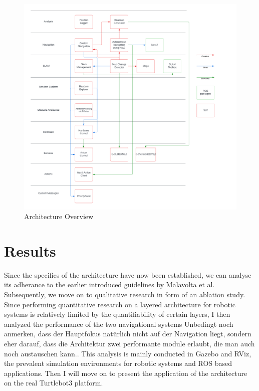 \documentclass[%
paper=A4,               %
twoside=true,           %
openright,              %
11pt,                   %
bibliography=totoc,     %
titlepage=on,           %
DIV=12,                 %
BCOR=1.5cm,             %
parskip=half,            %
final
]{scrreprt}
\begin{document}
			
	\begin{figure}[H]
		\begin{flushleft}
		\includegraphics[width=1.\textwidth]{Graphics/ArchitectureOverview}
		\caption{Architecture Overview}
		\label{fig: fig8}
		\end{flushleft}
	\end{figure}
	
	
	
	

	\chapter{Results}
	Since the specifics of the architecture have now been established, we can analyse its adherance to the earlier introduced guidelines by Malavolta et al. Subsequently, we move on to qualitative research in form of an ablation study.
	Since performing quantitative research on a layered architecture for robotic systems is relatively limited by the quantifiability of certain layers, I then analyzed the performance of the two navigational systems {\color{red} Unbedingt noch anmerken, dass der Hauptfokus natürlich nicht auf der Navigation liegt, sondern eher darauf, dass die Architektur zwei performante module erlaubt, die man auch noch austauschen kann.}. This analysis is mainly conducted in Gazebo and RViz, the prevalent simulation environments for robotic systems and ROS based applications. Then I will move on to present the application of the architecture on the real Turtlebot3 platform. 
\end{document}
